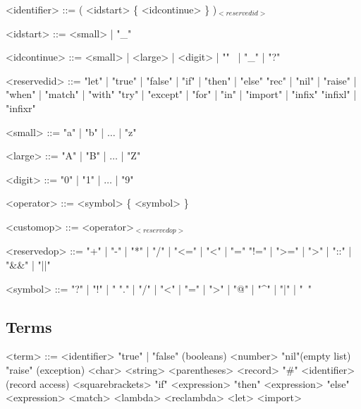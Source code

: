 \documentclass{article}
\begin{document}
\begin{grammar}
  <identifier> ::= ( <idstart> \{ <idcontinue> \} )$_{<reservedid>}$

  <idstart> ::= <small> | "_"

  <idcontinue> ::= <small> | <large> | <digit> | "\textquotesingle" \ | "_" | "?"
\end{grammar}

\begin{grammar}
  <reservedid> ::= "let" | "true" | "false" | "if" | "then" | "else"
  \alt "rec" | "nil" | "raise" | "when" | "match" | "with"
  \alt "try" | "except" | "for" | "in" | "import" | "infix"
  \alt "infixl" | "infixr"
\end{grammar}

\begin{grammar}
  <small> ::= "a" | "b" | $\ldots$ | "z"

  <large> ::= "A" | "B" | $\ldots$ | "Z"

  <digit> ::= "0" | "1" | $\ldots$ | "9"
\end{grammar}

\begin{grammar}
  <operator> ::= <symbol> \{ <symbol> \}

  <customop> ::= <operator>$_{<reservedop>}$

  <reservedop> ::= "+" | "-" | "*" | "/" | "<=" | "<" | "="
  \alt "!=" | ">=" | ">" | "::" | "&&" | "||"

  <symbol> ::= "?" | "!" | "%
  \alt "." | "/" | "<" | "=" | ">" | "@" | "^" | "|" | "~"
\end{grammar}

\newpage

\subsection{Terms}

\begin{grammar}
  <term> ::= <identifier>
  \alt "true" | "false" \hfill (booleans)
  \alt <number>
  \alt "nil"\hfill (empty list)
  \alt "raise" \hfill (exception)
  \alt <char>
  \alt <string>
  \alt <parentheses>
  \alt <record>
  \alt "#" <identifier> \hfill (record access)
  \alt <squarebrackets>
  \alt "if" \textvisiblespace <expression> "then" \textvisiblespace <expression> "else" \textvisiblespace <expression>
  \alt <match>
  \alt <lambda>
  \alt <reclambda>
  \alt <let>
  \alt <import>
\end{grammar}
\end{document}
